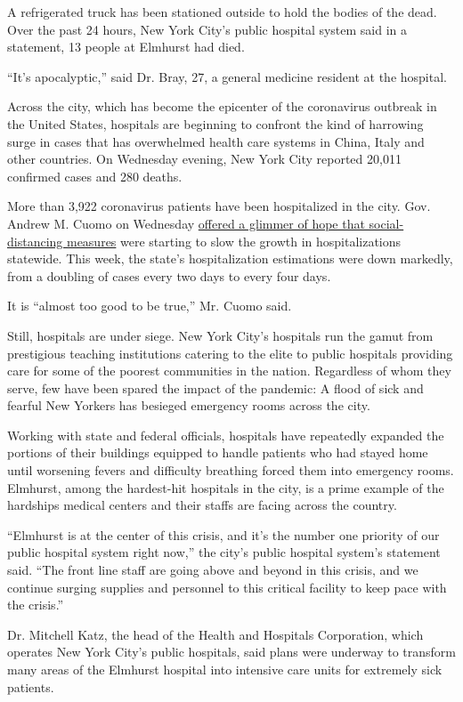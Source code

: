 A refrigerated truck has been stationed outside to hold the bodies of
the dead. Over the past 24 hours, New York City's public hospital system
said in a statement, 13 people at Elmhurst had died.

``It's apocalyptic,'' said Dr. Bray, 27, a general medicine resident at
the hospital.

Across the city, which has become the epicenter of the coronavirus
outbreak in the United States, hospitals are beginning to confront the
kind of harrowing surge in cases that has overwhelmed health care
systems in China, Italy and other countries. On Wednesday evening, New
York City reported 20,011 confirmed cases and 280 deaths.

More than 3,922 coronavirus patients have been hospitalized in the city.
Gov. Andrew M. Cuomo on Wednesday
\href{https://www.nytimes.com/2020/03/25/nyregion/coronavirus-new-york-update.html}{offered
a glimmer of hope that social-distancing measures} were starting to slow
the growth in hospitalizations statewide. This week, the state's
hospitalization estimations were down markedly, from a doubling of cases
every two days to every four days.

It is ``almost too good to be true,'' Mr. Cuomo said.

Still, hospitals are under siege. New York City's hospitals run the
gamut from prestigious teaching institutions catering to the elite to
public hospitals providing care for some of the poorest communities in
the nation. Regardless of whom they serve, few have been spared the
impact of the pandemic: A flood of sick and fearful New Yorkers has
besieged emergency rooms across the city.

Working with state and federal officials, hospitals have repeatedly
expanded the portions of their buildings equipped to handle patients who
had stayed home until worsening fevers and difficulty breathing forced
them into emergency rooms. Elmhurst, among the hardest-hit hospitals in
the city, is a prime example of the hardships medical centers and their
staffs are facing across the country.

``Elmhurst is at the center of this crisis, and it's the number one
priority of our public hospital system right now,'' the city's public
hospital system's statement said. ``The front line staff are going above
and beyond in this crisis, and we continue surging supplies and
personnel to this critical facility to keep pace with the crisis.''

Dr. Mitchell Katz, the head of the Health and Hospitals Corporation,
which operates New York City's public hospitals, said plans were
underway to transform many areas of the Elmhurst hospital into intensive
care units for extremely sick patients.

